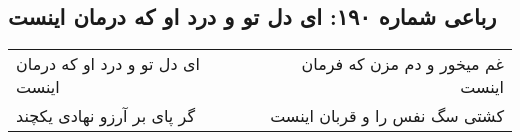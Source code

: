 \begin{center}
\section*{رباعی شماره ۱۹۰: ای دل تو و درد او که درمان اینست}
\label{sec:0190}
\begin{longtable}{l p{0.5cm} r}
ای دل تو و درد او که درمان اینست
&&
غم میخور و دم مزن که فرمان اینست
\\
گر پای بر آرزو نهادی یکچند
&&
کشتی سگ نفس را و قربان اینست
\\
\end{longtable}
\end{center}
